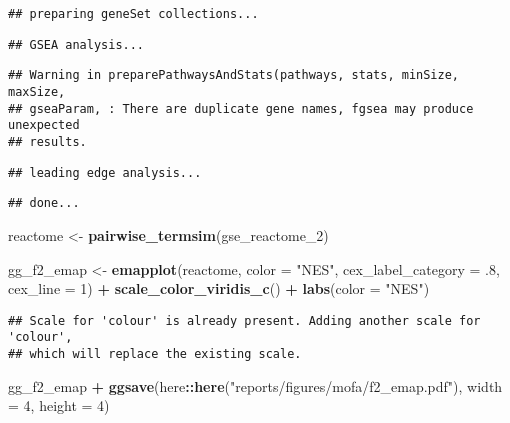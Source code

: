 \documentclass[
]{article}
\newenvironment{Shaded}{\begin{snugshade}}{\end{snugshade}}
\newcommand{\DataTypeTok}[1]{\textcolor[rgb]{0.13,0.29,0.53}{#1}}
\newcommand{\DecValTok}[1]{\textcolor[rgb]{0.00,0.00,0.81}{#1}}
\newcommand{\FloatTok}[1]{\textcolor[rgb]{0.00,0.00,0.81}{#1}}
\newcommand{\KeywordTok}[1]{\textcolor[rgb]{0.13,0.29,0.53}{\textbf{#1}}}
\newcommand{\NormalTok}[1]{#1}
\newcommand{\OperatorTok}[1]{\textcolor[rgb]{0.81,0.36,0.00}{\textbf{#1}}}
\newcommand{\StringTok}[1]{\textcolor[rgb]{0.31,0.60,0.02}{#1}}
\begin{document}
\begin{verbatim}
## preparing geneSet collections...
\end{verbatim}

\begin{verbatim}
## GSEA analysis...
\end{verbatim}

\begin{verbatim}
## Warning in preparePathwaysAndStats(pathways, stats, minSize, maxSize,
## gseaParam, : There are duplicate gene names, fgsea may produce unexpected
## results.
\end{verbatim}

\begin{verbatim}
## leading edge analysis...
\end{verbatim}

\begin{verbatim}
## done...
\end{verbatim}

\begin{Shaded}
\begin{Highlighting}[]
\NormalTok{reactome <-}\StringTok{ }\KeywordTok{pairwise_termsim}\NormalTok{(gse_reactome_}\DecValTok{2}\NormalTok{) }

\NormalTok{gg_f2_emap <-}\StringTok{ }\KeywordTok{emapplot}\NormalTok{(reactome, }\DataTypeTok{color =} \StringTok{"NES"}\NormalTok{,}
         \DataTypeTok{cex_label_category =} \FloatTok{.8}\NormalTok{,}
         \DataTypeTok{cex_line =} \DecValTok{1}\NormalTok{) }\OperatorTok{+}\StringTok{ }
\StringTok{  }\KeywordTok{scale_color_viridis_c}\NormalTok{() }\OperatorTok{+}\StringTok{ }
\StringTok{  }\KeywordTok{labs}\NormalTok{(}\DataTypeTok{color =} \StringTok{"NES"}\NormalTok{)}
\end{Highlighting}
\end{Shaded}

\begin{verbatim}
## Scale for 'colour' is already present. Adding another scale for 'colour',
## which will replace the existing scale.
\end{verbatim}

\begin{Shaded}
\begin{Highlighting}[]
\NormalTok{gg_f2_emap }\OperatorTok{+}\StringTok{ }
\StringTok{  }\KeywordTok{ggsave}\NormalTok{(here}\OperatorTok{::}\KeywordTok{here}\NormalTok{(}\StringTok{"reports/figures/mofa/f2_emap.pdf"}\NormalTok{), }\DataTypeTok{width =} \DecValTok{4}\NormalTok{, }\DataTypeTok{height =} \DecValTok{4}\NormalTok{)}
\end{Highlighting}
\end{Shaded}
\end{document}
